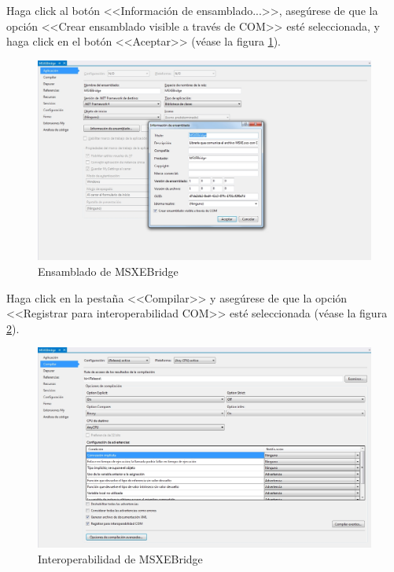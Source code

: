 Haga click al bot\'{o}n <<Informaci\'{o}n de ensamblado...>>, aseg\'{u}rese de que la opci\'{o}n <<Crear ensamblado visible a trav\'{e}s de COM>> est\'{e} seleccionada, y haga click en el bot\'{o}n <<Aceptar>> (v\'{e}ase la figura \ref{fig:vs-ensamblado}).
\vfill
\begin{figure}[H]
  \centering
  \includegraphics[width=.75\linewidth]{./img/vs-ensamblado.jpg}
\caption[]{Ensamblado de MSXEBridge\label{fig:vs-ensamblado}}
\end{figure}
\vfill
Haga click en la pesta\~{n}a <<Compilar>> y aseg\'{u}rese de que la opci\'{o}n <<Registrar para interoperabilidad COM>> est\'{e} seleccionada (v\'{e}ase la figura \ref{fig:vs-compilar}).
\vfill
\begin{figure}[H]
  \centering
  \includegraphics[width=.75\linewidth]{./img/vs-compilar.jpg}
\caption[]{Interoperabilidad de MSXEBridge\label{fig:vs-compilar}}
\end{figure}
\vfill
\newpage

